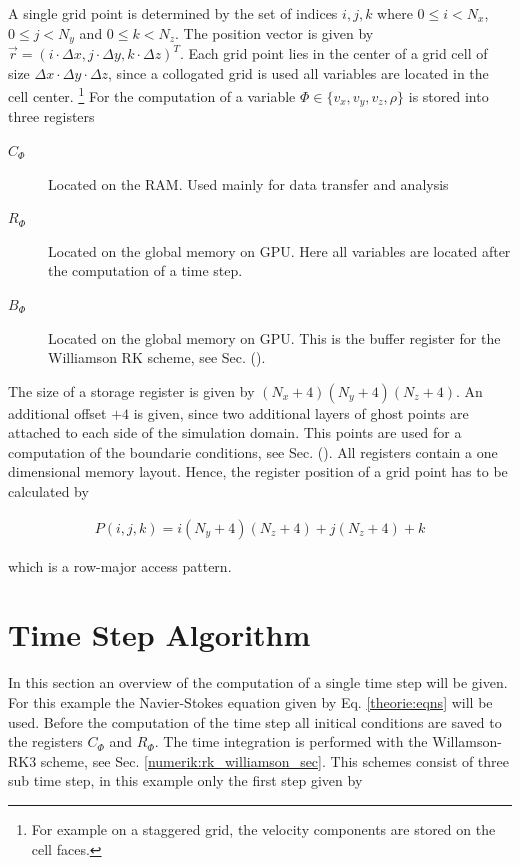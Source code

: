 A single grid point is determined by the set of indices $i,j,k$ where ${0\leq i < N_x}$,
${0\leq j < N_y}$ and ${0\leq k < N_z}$. The position vector is given by ${\vec{r} = (i\cdot\Delta x, j\cdot \Delta y, k\cdot \Delta z)^T}$.
Each grid point lies in the center of a grid cell of size $\Delta x \cdot \Delta y \cdot \Delta z$,
since a collogated grid is used all variables are located in the cell center.
\footnote{For example on a staggered grid, the velocity components are stored on the cell faces.}
For the computation of a variable $\Phi\in\{v_x, v_y, v_z, \rho\}$ is stored into three registers
\begin{description}
    \item[$C_\Phi$] Located on the RAM. Used mainly for data transfer and analysis
    \item[$R_\Phi$] Located on the global memory on GPU. Here all variables are located after the computation of a time step.
    \item[$B_\Phi$] Located on the global memory on GPU. This is the buffer register for the Williamson RK scheme, see Sec. ().
\end{description}

The size of a storage register is given by $(N_x+4)(N_y+4)(N_z+4)$.
An additional offset $+4$ is given, since two additional layers of ghost points are attached to each side of the simulation domain.
This points are used for a computation of the boundarie conditions, see Sec. ().
All registers contain a one dimensional memory layout.
Hence, the register position of a grid point has to be calculated by

\begin{align}
    P(i, j, k) = i(N_y+4)(N_z+4)+j(N_z+4)+k
\end{align}

which is a row-major access pattern.

\section{Time Step Algorithm}

In this section an overview of the computation of a single time step will be given.
For this example the Navier-Stokes equation given by Eq. \ref{theorie:eqns} will be used.
Before the computation of the time step all initical conditions are saved to the
registers $C_{\Phi}$ and  $R_{\Phi}$.
The time integration is performed with the Willamson-RK3 scheme, see Sec. \ref{numerik:rk_williamson_sec}.
This schemes consist of three sub time step, in this example only the first step given by

